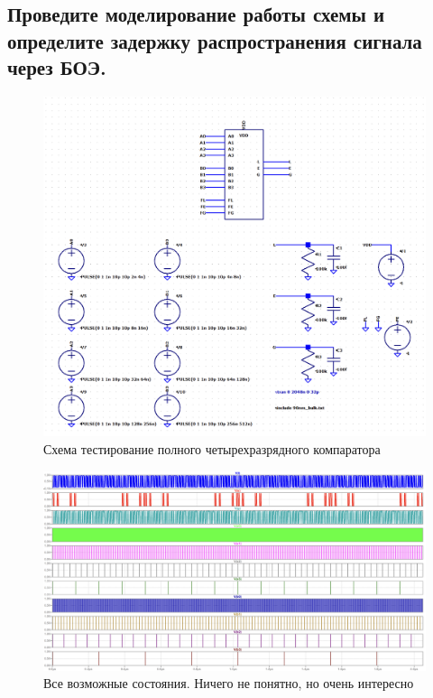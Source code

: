 \documentclass[12pt,onecolumn]{article}
\begin{document}
\subsection{Проведите моделирование работы схемы и определите задержку распространения сигнала через БОЭ.}
\begin{figure}[H]
    \centering
    \includegraphics[width=\textwidth]{image/full-comparator-test-env.png}
    \caption{Схема тестирование полного четырехразрядного компаратора}
\end{figure}
\begin{figure}[H]
    \centering
    \includegraphics[width=\textwidth]{image/full-comparator-test-all-states.png}
    \caption{Все возможные состояния. Ничего не понятно, но очень интересно}
\end{figure}
\end{document}
